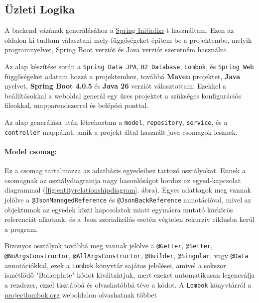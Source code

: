 \subsection{Üzleti Logika}

A backend vázának generálásához a \href{https://start.spring.io/}{Spring Initializr}-t használtam. Ezen az oldalon ki tudtam választani mely függőségeket építem be a projektembe, melyik programnyelvet, Spring Boot verziót és Java verziót szeretném használni.

Az alap készítése során a \texttt{Spring Data JPA}, \texttt{H2 Database}, \texttt{Lombok}, és \texttt{Spring Web} függőségeket adatam hozzá a projektemhez, továbbá \textbf{Maven} projektet, \textbf{Java} nyelvet, \textbf{Spring Boot 4.0.5} és \textbf{Java 26} verziót választottam. Ezekkel a beállításokkal a weboldal generál egy üres projektet a szükséges konfigurációs fileokkal, mapparendszerrel és belépési ponttal.

Az alap generálása után létrehoztam a \texttt{model}, \texttt{repository}, \texttt{service}, és a \texttt{controller} mappákat, amik a projekt által használt java csomagok lesznek.

\paragraph{Model csomag:\label{par:model}}

Ez a csomag tartalmazza az adatbázis egyedeihez tartozó osztályokat. Ennek a csomagnak az osztálydiagramja nagy hasonlóságot hordoz az egyed-kapcsolat diagrammal (\ref{fig:entityrelationshipdiagram}. ábra). Egyes adattagok meg vannak jelölve a \texttt{@JsonManagedReference} és \texttt{@JsonBackReference} annotációval, mivel az objektumok az egyedek közti kapcsolatok miatt egymásra mutató körkörös referenciát alkotnak, és a Json szerializálás esetén végtelen rekurzív ciklusba kerül a program. 

Bizonyos osztályok továbbá meg vannak jelölve a \texttt{@Getter}, \texttt{@Setter}, \texttt{@NoArgsConstructor}, \texttt{@AllArgsConstructor}, \texttt{@Builder}, \texttt{@Singular}, vagy \texttt{@Data} annotációkkal, ezek a \texttt{Lombok} könyvtár sajátos jelölései, amivel a sokszor ismétlődő "Boilerplate" kódot kiváltahtjuk, mert ezeket automatikusan legenerálja a rendszer, ezzel tisztábbá és olvashatóbbá téve a kódot. A \texttt{Lombok} könyvtárról a \href{https://projectlombok.org/}{projectlombok.org} weboldalon olvashatnak többet

